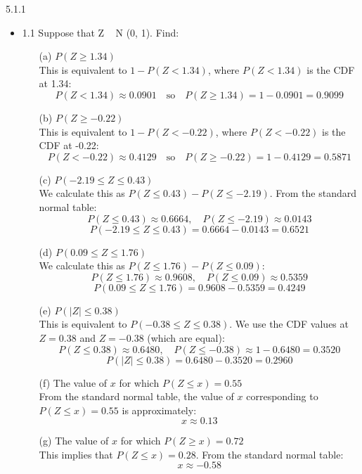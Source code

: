 \documentclass{article}
\begin{document}
5.1.1
\begin{itemize}
    \item 1.1 Suppose that Z ~ N (0, 1). Find: 
    \begin{itemize}
    \item[(a)] \( P(Z \geq 1.34) \) \\
    This is equivalent to \( 1 - P(Z < 1.34) \), where \( P(Z < 1.34) \) is the CDF at 1.34:
    \[
    P(Z < 1.34) \approx 0.0901 \quad \text{so} \quad P(Z \geq 1.34) = 1 - 0.0901 = 0.9099
    \]

    \item[(b)] \( P(Z \geq -0.22) \) \\
    This is equivalent to \( 1 - P(Z < -0.22) \), where \( P(Z < -0.22) \) is the CDF at -0.22:
    \[
    P(Z < -0.22) \approx 0.4129 \quad \text{so} \quad P(Z \geq -0.22) = 1 - 0.4129 = 0.5871
    \]

    \item[(c)] \( P(-2.19 \leq Z \leq 0.43) \) \\
    We calculate this as \( P(Z \leq 0.43) - P(Z \leq -2.19) \). From the standard normal table:
    \[
    P(Z \leq 0.43) \approx 0.6664, \quad P(Z \leq -2.19) \approx 0.0143
    \]
    \[
    P(-2.19 \leq Z \leq 0.43) = 0.6664 - 0.0143 = 0.6521
    \]

    \item[(d)] \( P(0.09 \leq Z \leq 1.76) \) \\
    We calculate this as \( P(Z \leq 1.76) - P(Z \leq 0.09) \):
    \[
    P(Z \leq 1.76) \approx 0.9608, \quad P(Z \leq 0.09) \approx 0.5359
    \]
    \[
    P(0.09 \leq Z \leq 1.76) = 0.9608 - 0.5359 = 0.4249
    \]

    \item[(e)] \( P(|Z| \leq 0.38) \) \\
    This is equivalent to \( P(-0.38 \leq Z \leq 0.38) \). We use the CDF values at \( Z = 0.38 \) and \( Z = -0.38 \) (which are equal):
    \[
    P(Z \leq 0.38) \approx 0.6480, \quad P(Z \leq -0.38) \approx 1 - 0.6480 = 0.3520
    \]
    \[
    P(|Z| \leq 0.38) = 0.6480 - 0.3520 = 0.2960
    \]

    \item[(f)] The value of \( x \) for which \( P(Z \leq x) = 0.55 \) \\
    From the standard normal table, the value of \( x \) corresponding to \( P(Z \leq x) = 0.55 \) is approximately:
    \[
    x \approx 0.13
    \]

    \item[(g)] The value of \( x \) for which \( P(Z \geq x) = 0.72 \) \\
    This implies that \( P(Z \leq x) = 0.28 \). From the standard normal table:
    \[
    x \approx -0.58
    \]


\end{itemize}
\end{itemize}
\end{document}
